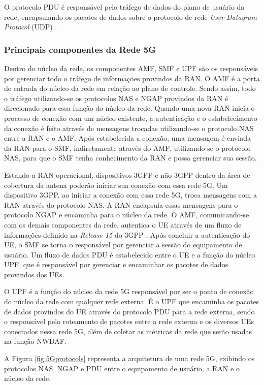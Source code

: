 O protocolo PDU é responsável pelo tráfego de dados do plano de usuário da rede, encapsulando os pacotes de dados sobre o protocolo de rede \textit{User Datagram Protocol} (UDP) \cite{3gpp.38.415}.

\subsubsection{Principais componentes da Rede 5G}

Dentro do núcleo da rede, os componentes AMF, SMF e UPF são os responsáveis por gerenciar todo o tráfego de informações provindos da RAN. O AMF é a porta de entrada do núcleo da rede em relação ao plano de controle. Sendo assim, todo o tráfego utilizando-se os protocolos NAS e NGAP provindos da RAN é direcionado para essa função do núcleo da rede.
Quando uma nova RAN inicia o processo de conexão com um núcleo existente, a autenticação e o estabelecimento da conexão é feito através de mensagens trocadas utilizando-se o protocolo NAS entre a RAN e o AMF. Após estabelecida a conexão, uma mensagem é enviada da RAN para o SMF, indiretamente através do AMF, utilizando-se o protocolo NAS, para que o SMF tenha conhecimento da RAN e possa gerenciar sua sessão.

Estando a RAN operacional, dispositivos 3GPP e não-3GPP dentro da área de cobertura da antena poderão iniciar sua conexão com essa rede 5G. Um dispositivo 3GPP, ao iniciar a conexão com essa rede 5G, troca mensagens com a RAN através do protocolo NAS. A RAN encapsula essas mensagens para o protocolo NGAP e encaminha para o núcleo da rede. O AMF, comunicando-se com os demais componentes da rede, autentica o UE através de um fluxo de informações definido na \textit{Release 15} do 3GPP \cite{3gpp.29.509}. Após concluir a autenticação do UE, o SMF se torna o responsável por gerenciar a sessão do equipamento de usuário. Um fluxo de dados PDU é estabelecido entre o UE e a função do núcleo UPF, que é responsável por gerenciar e encaminhar os pacotes de dados provindos dos UEs.

O UPF é a função do núcleo da rede 5G responsável por ser o ponto de conexão do núcleo da rede com qualquer rede externa. É o UPF que encaminha os pacotes de dados provindos do UE através do protocolo PDU para a rede externa, sendo o responsável pelo roteamento de pacotes entre a rede externa e os diversos UEs conectados nessa rede 5G, além de coletar as métricas da rede que serão usadas na função NWDAF.

A Figura \ref{fig:5Gprotocols} representa a arquitetura de uma rede 5G, exibindo os protocolos NAS, NGAP e PDU entre o equipamento de usuário, a RAN e o núcleo da rede.

